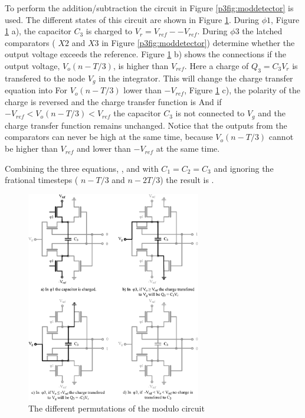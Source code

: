 To perform the addition/subtraction the circuit in Figure
\ref{p3fig:moddetector} is used. The different states of this circuit are
shown in Figure \ref{p3fig:moddetexpl}. During $\phi 1$, Figure
\ref{p3fig:moddetexpl} a), the capacitor $C_3$ is charged to $V_r =
V_{ref} - -V_{ref}$. During $\phi 3$ the latched comparators ( $X2$
and $X3$ in Figure \ref{p3fig:moddetector})
determine whether the output voltage exceeds the reference. Figure
\ref{p3fig:moddetexpl} b) shows the connections if the
output voltage, $V_o(n-T/3)$, is higher than $V_{ref}$. Here a charge
of $Q_3 = C_3V_r$ is transfered to the node $V_g$ in the
integrator. This will change the charge transfer equation into
For $V_o(n-T/3)$ lower than $-V_{ref}$, Figure \ref{p3fig:moddetexpl}
c), the polarity of the charge is reversed and the charge transfer
function is
And if $-V_{ref} < V_o(n-T/3) < V_{ref}$ the capacitor $C_3$ is not
connected to $V_g$ and the charge transfer function 
remains unchanged. Notice that the outputs from the comparators can
never be high at the same time, because $V_o(n-T/3)$ cannot be higher
than $V_{ref}$ and lower than $-V_{ref}$ at the same time.

Combining the three equations,
,  and  with $C_1 = C_2 = C_3$ and ignoring the
frational timesteps ( $n-T/3$ and
$n-2T/3$) the result is .

\begin{figure}[ht]
\centering 
 \includegraphics[width=3in]{graphics/moddetexpl}
  \caption{The different permutations of the modulo circuit}
  \label{p3fig:moddetexpl}
\end{figure}


